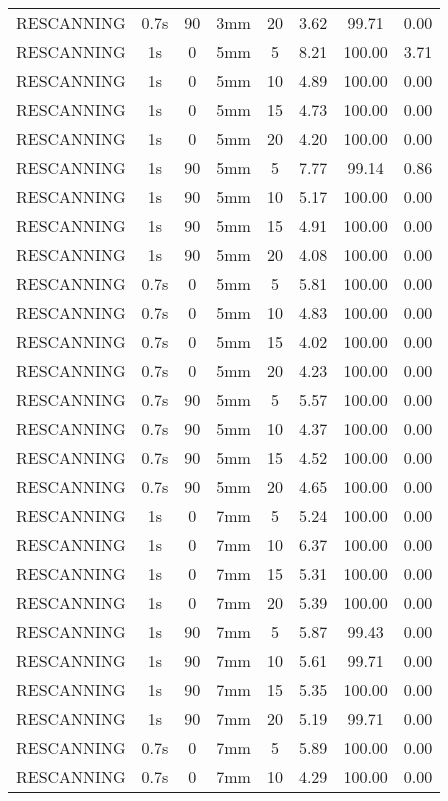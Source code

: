 \begin{table}[H]
\begin{tabular}{|c||c|c|c|c||c|c|c|}
RESCANNING & 0.7s & 90 & 3mm & 20 & 3.62 & 99.71 & 0.00 \\
RESCANNING & 1s & 0 & 5mm & 5 & 8.21 & 100.00 & 3.71 \\
RESCANNING & 1s & 0 & 5mm & 10 & 4.89 & 100.00 & 0.00 \\
RESCANNING & 1s & 0 & 5mm & 15 & 4.73 & 100.00 & 0.00 \\
RESCANNING & 1s & 0 & 5mm & 20 & 4.20 & 100.00 & 0.00 \\
RESCANNING & 1s & 90 & 5mm & 5 & 7.77 & 99.14 & 0.86 \\
RESCANNING & 1s & 90 & 5mm & 10 & 5.17 & 100.00 & 0.00 \\
RESCANNING & 1s & 90 & 5mm & 15 & 4.91 & 100.00 & 0.00 \\
RESCANNING & 1s & 90 & 5mm & 20 & 4.08 & 100.00 & 0.00 \\
RESCANNING & 0.7s & 0 & 5mm & 5 & 5.81 & 100.00 & 0.00 \\
RESCANNING & 0.7s & 0 & 5mm & 10 & 4.83 & 100.00 & 0.00 \\
RESCANNING & 0.7s & 0 & 5mm & 15 & 4.02 & 100.00 & 0.00 \\
RESCANNING & 0.7s & 0 & 5mm & 20 & 4.23 & 100.00 & 0.00 \\
RESCANNING & 0.7s & 90 & 5mm & 5 & 5.57 & 100.00 & 0.00 \\
RESCANNING & 0.7s & 90 & 5mm & 10 & 4.37 & 100.00 & 0.00 \\
RESCANNING & 0.7s & 90 & 5mm & 15 & 4.52 & 100.00 & 0.00 \\
RESCANNING & 0.7s & 90 & 5mm & 20 & 4.65 & 100.00 & 0.00 \\
RESCANNING & 1s & 0 & 7mm & 5 & 5.24 & 100.00 & 0.00 \\
RESCANNING & 1s & 0 & 7mm & 10 & 6.37 & 100.00 & 0.00 \\
RESCANNING & 1s & 0 & 7mm & 15 & 5.31 & 100.00 & 0.00 \\
RESCANNING & 1s & 0 & 7mm & 20 & 5.39 & 100.00 & 0.00 \\
RESCANNING & 1s & 90 & 7mm & 5 & 5.87 & 99.43 & 0.00 \\
RESCANNING & 1s & 90 & 7mm & 10 & 5.61 & 99.71 & 0.00 \\
RESCANNING & 1s & 90 & 7mm & 15 & 5.35 & 100.00 & 0.00 \\
RESCANNING & 1s & 90 & 7mm & 20 & 5.19 & 99.71 & 0.00 \\
RESCANNING & 0.7s & 0 & 7mm & 5 & 5.89 & 100.00 & 0.00 \\
RESCANNING & 0.7s & 0 & 7mm & 10 & 4.29 & 100.00 & 0.00 \\

\end{tabular}
\end{table}
